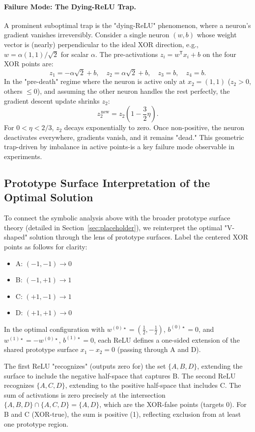 \paragraph{Failure Mode: The Dying-ReLU Trap.}
A prominent suboptimal trap is the "dying-ReLU" phenomenon, where a neuron's gradient vanishes irreversibly. Consider a single neuron \((w,b)\) whose weight vector is (nearly) perpendicular to the ideal XOR direction, e.g., \(w = \alpha (1, 1)/\sqrt{2}\) for scalar \(\alpha\). The pre-activations \(z_i = w^{\mathsf T}x_i + b\) on the four XOR points are:
\[
    z_1 = -\alpha\sqrt{2}+b, \quad z_2=\alpha\sqrt{2}+b, \quad z_3=b, \quad z_4=b.
\]
In the "pre-death" regime where the neuron is active only at \(x_2=(1,1)\) (\(z_2 > 0\), others \(\leq 0\)), and assuming the other neuron handles the rest perfectly, the gradient descent update shrinks \(z_2\):
\[
    z_2^{\,\text{new}} = z_2 \left(1-\frac{3}{2}\eta\right).
\]
For \(0 < \eta < 2/3\), \(z_2\) decays exponentially to zero. Once non-positive, the neuron deactivates everywhere, gradients vanish, and it remains "dead." This geometric trap-driven by imbalance in active points-is a key failure mode observable in experiments.

\subsection*{Prototype Surface Interpretation of the Optimal Solution}

To connect the symbolic analysis above with the broader prototype surface theory (detailed in Section~\ref{sec:placeholder}), we reinterpret the optimal "V-shaped" solution through the lens of prototype surfaces. Label the centered XOR points as follows for clarity:

\begin{itemize}
    \item A: $(-1, -1) \to 0$
    \item B: $(-1, +1) \to 1$
    \item C: $(+1, -1) \to 1$
    \item D: $(+1, +1) \to 0$
\end{itemize}

In the optimal configuration with $w^{(0)\star} = (\frac{1}{2}, -\frac{1}{2})$, $b^{(0)\star}=0$, and $w^{(1)\star} = -w^{(0)\star}$, $b^{(1)\star}=0$, each ReLU defines a one-sided extension of the shared prototype surface $x_1 - x_2 = 0$ (passing through A and D).

The first ReLU "recognizes" (outputs zero for) the set $\{A, B, D\}$, extending the surface to include the negative half-space that captures B. The second ReLU recognizes $\{A, C, D\}$, extending to the positive half-space that includes C. The sum of activations is zero precisely at the intersection $\{A, B, D\} \cap \{A, C, D\} = \{A, D\}$, which are the XOR-false points (targets 0). For B and C (XOR-true), the sum is positive (1), reflecting exclusion from at least one prototype region.

